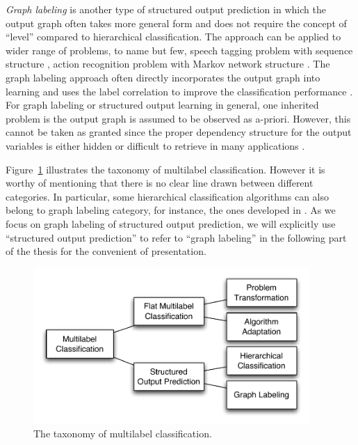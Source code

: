 \textit{Graph labeling} is another type of structured output prediction in which the output graph often takes more general form and does not require the concept of ``level'' compared to hierarchical classification.
The approach can be applied to wider range of problems, to name but few, speech tagging problem with sequence structure \citep{collins02a}, action recognition problem with Markov network structure \citep{Wang11hidden}. 
The graph labeling approach often directly incorporates the output graph into learning and uses the label correlation to improve the classification performance \citep{collins02a,lafferty01,taskar02,Taskar04max,THJA04,Rousu07}.
For graph labeling or structured output learning in general, one inherited problem is the output graph is assumed to be observed as a-priori.
However, this cannot be taken as granted since the proper dependency structure for the output variables is either hidden or difficult to retrieve in many applications \citep{Chickering94learning}.

Figure~\ref{multilabel_taxonomy} illustrates the taxonomy of multilabel classification.
However it is worthy of mentioning that there is no clear line drawn between different categories.
In particular, some hierarchical classification algorithms can also belong to graph labeling category, for instance, the ones developed in \citep{THJA04,Rousu06}.
As we focus on graph labeling of structured output prediction, we will explicitly use ``structured output prediction'' to refer to ``graph labeling'' in the following part of the thesis for the convenient of presentation.

\begin{figure}
\begin{center}
	\centering
	\includegraphics[width=10.5cm]{./taxonomy.pdf}
	\caption{The taxonomy of multilabel classification.}
	\label{multilabel_taxonomy}
\end{center}
\end{figure}

